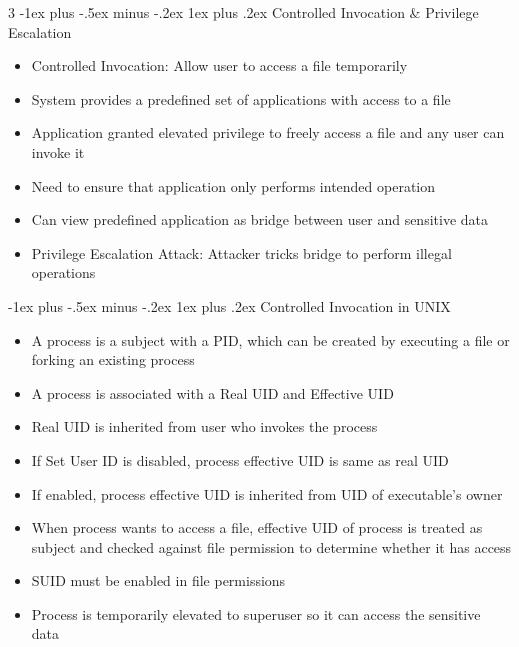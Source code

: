 \documentclass[10pt, landscape]{article}
\makeatletter
\renewcommand{\subsection}{\@startsection{subsection}{3}{0mm}%
                                {-1ex plus -.5ex minus -.2ex}%
                                {1ex plus .2ex}%
                                {\normalfont\small\bfseries}}%
\makeatother
\begin{document}
\begin{multicols*}{3}
\subsection{Controlled Invocation \& Privilege Escalation}
\begin{itemize}
    \item Controlled Invocation: Allow user to access a file temporarily
    \item System provides a predefined set of applications with access to a file
    \item Application granted elevated privilege to freely access a file and any user can invoke it
    \item Need to ensure that application only performs intended operation
    \item Can view predefined application as bridge between user and sensitive data
    \item Privilege Escalation Attack: Attacker tricks bridge to perform illegal operations
\end{itemize}

\subsection{Controlled Invocation in UNIX}
\begin{itemize}
    \item A process is a subject with a PID, which can be created by executing a file or forking an existing process
    \item A process is associated with a Real UID and Effective UID
    \item Real UID is inherited from user who invokes the process
    \item If Set User ID is disabled, process effective UID is same as real UID
    \item If enabled, process effective UID is inherited from UID of executable's owner
    \item When process wants to access a file, effective UID of process is treated as subject and checked against file permission to determine whether it has access
    \item SUID must be enabled in file permissions
    \item Process is temporarily elevated to superuser so it can access the sensitive data
\end{itemize}

\end{multicols*}
\end{document}
